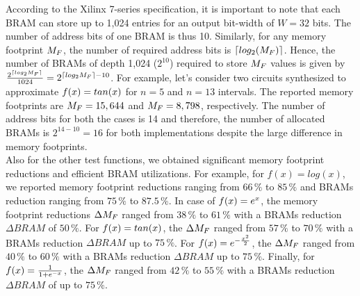 {According to the Xilinx 7-series specification, it is important to note that each BRAM can store up to 1,024 entries for an output bit-width of $W=32$ bits. The number of address bits of one BRAM is thus 10. Similarly, for any memory footprint $M_{F}$, the number of required address bits is $\lceil log_2(M_{F})\rceil$. 
Hence, the number of BRAMs of depth 1,024 ($2^{10}$) required to store $M_{F}$ values is given by $\frac{2^{\lceil log_2 M_{F} \rceil}}{1024}=2^{\lceil log_2 M_{F} \rceil-10}$.
For example, let's consider two circuits synthesized to approximate $f(x)=tan(x)$ for $n=5$ and $n=13$ intervals. 
The reported memory footprints are $M_{F}=15,644$ and $M_{F}=8,798$, respectively. 
The number of address bits for both the cases is 14 and therefore, the number of allocated BRAMs is $2^{14-10}=16$ for both implementations despite the large difference in memory footprints.} \\
{Also for} the {other} test functions, we obtained significant memory footprint reductions and efficient BRAM utilization{s}.
For {example, for} $f(x)=log(x)$, we reported memory footprint reductions ranging from $66\,\%$ to $85\,\%$ and BRAMs reduction ranging from $75\,\%$ to $87.5\,\%$.
In case of $f(x)=e^x$, the memory footprint reductions ${\Delta M_{F}}$ ranged from $38\,\%$ to $61\,\%$ with a BRAMs reduction ${\Delta BRAM}$ of $50\,\%$.
For $f(x)=tan(x)$, the ${\Delta M_{F}}$ ranged from $57\,\%$ to $70\,\%$ with a BRAMs reduction ${\Delta BRAM}$ up to $75\,\%$.
For $f(x)=e^{-\frac{x^2}{2}}$, the ${\Delta M_{F}}$ ranged from $40\,\%$ to $60\,\%$ with a BRAMs reduction ${\Delta BRAM}$ up to $75\,\%$.
Finally, for $f(x)=\frac{1}{1+e^{-x}}$, the ${\Delta M_{F}}$ ranged from $42\,\%$ to $55\,\%$ with a BRAMs reduction ${\Delta BRAM}$ {of up} to $75\,\%$.
